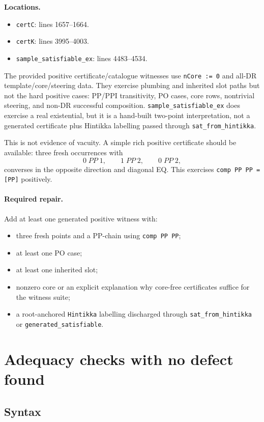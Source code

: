 \documentclass[11pt]{article}
\begin{document}
\textbf{Locations.}
\begin{itemize}
  \item \texttt{certC}: lines 1657--1664.
  \item \texttt{certK}: lines 3995--4003.
  \item \texttt{sample\_satisfiable\_ex}: lines 4483--4534.
\end{itemize}

The provided positive certificate/catalogue witnesses use \texttt{nCore := 0}
and all-DR template/core/steering data.  They exercise plumbing and inherited
slot paths but not the hard positive cases: PP/PPI transitivity, PO cases,
core rows, nontrivial steering, and non-DR successful composition.
\texttt{sample\_satisfiable\_ex} does exercise a real existential, but it is a
hand-built two-point interpretation, not a generated certificate plus Hintikka
labelling passed through \texttt{sat\_from\_hintikka}.

This is not evidence of vacuity.  A simple rich positive certificate should be
available: three fresh occurrences with
\[
  0\;PP\;1, \qquad 1\;PP\;2, \qquad 0\;PP\;2,
\]
converses in the opposite direction and diagonal EQ.  This exercises
\texttt{comp PP PP = [PP]} positively.

\paragraph{Required repair.}
Add at least one generated positive witness with:
\begin{itemize}
  \item three fresh points and a PP-chain using \texttt{comp PP PP};
  \item at least one PO case;
  \item at least one inherited slot;
  \item nonzero core or an explicit explanation why core-free certificates
        suffice for the witness suite;
  \item a root-anchored \texttt{Hintikka} labelling discharged through
        \texttt{sat\_from\_hintikka} or \texttt{generated\_satisfiable}.
\end{itemize}

\section{Adequacy checks with no defect found}

\subsection{Syntax}
\end{document}
